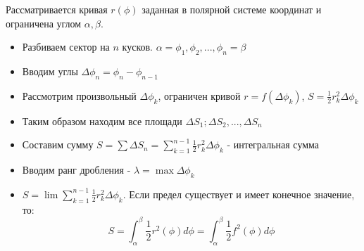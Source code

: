     Рассматривается кривая $r (\phi)$ заданная в полярной системе координат и ограничена углом $\alpha, \beta$. 
    \begin{itemize}
        \item Разбиваем сектор на $n$ кусков. $\alpha = \phi_1, \phi_2, ... , \phi_n = \beta$
        \item Вводим углы $\Delta \phi_n = \phi_n - \phi_{n-1}$
        \item Рассмотрим произвольный $\Delta \phi_k$, ограничен кривой $r =f(\Delta \phi_k)$, $S = \frac{1}{2} r^2_k \Delta \phi_k$
        \item Таким образом находим все площади $\Delta S_1; \Delta S_2, ... , \Delta S_n$
        \item Составим сумму $S = \sum \Delta S_n = \sum_{k=1}^{n-1} \frac{1}{2} r^2_k \Delta \phi_k$ - интегральная сумма
        \item Вводим ранг дробления - $\lambda = \max \Delta \phi_k$
        \item $S = \lim \sum_{k=1}^{n-1} \frac{1}{2} r^2_k \Delta \phi_k$. Если предел существует и имеет конечное значение, то: $$S = \int_{\alpha}^{\beta} \frac{1}{2} r^2(\phi) d\phi = \int^{\beta}_{\alpha} \frac{1}{2} f^2(\phi) d\phi$$
    \end{itemize}